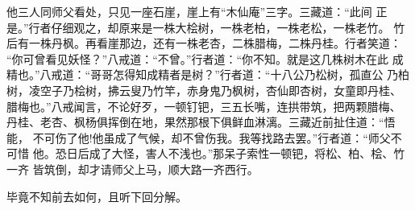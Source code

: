 他三人同师父看处，只见一座石崖，崖上有“木仙庵”三字。三藏道：“此间
正是。”行者仔细观之，却原来是一株大桧树，一株老柏，一株老松，一株老竹。
竹后有一株丹枫。再看崖那边，还有一株老杏，二株腊梅，二株丹桂。行者笑道：
“你可曾看见妖怪？”八戒道：“不曾。”行者道：“你不知。就是这几株树木在此
成精也。”八戒道：“哥哥怎得知成精者是树？”行者道：“十八公乃松树，孤直公
乃柏树，凌空子乃桧树，拂云叟乃竹竿，赤身鬼乃枫树，杏仙即杏树，女童即丹桂、
腊梅也。”八戒闻言，不论好歹，一顿钉钯，三五长嘴，连拱带筑，把两颗腊梅、
丹桂、老杏、枫杨俱挥倒在地，果然那根下俱鲜血淋漓。三藏近前扯住道：“悟能，
不可伤了他!他虽成了气候，却不曾伤我。我等找路去罢。”行者道：“师父不可惜
他。恐日后成了大怪，害人不浅也。”那呆子索性一顿钯，将松、柏、桧、竹一齐
皆筑倒，却才请师父上马，顺大路一齐西行。

毕竟不知前去如何，且听下回分解。